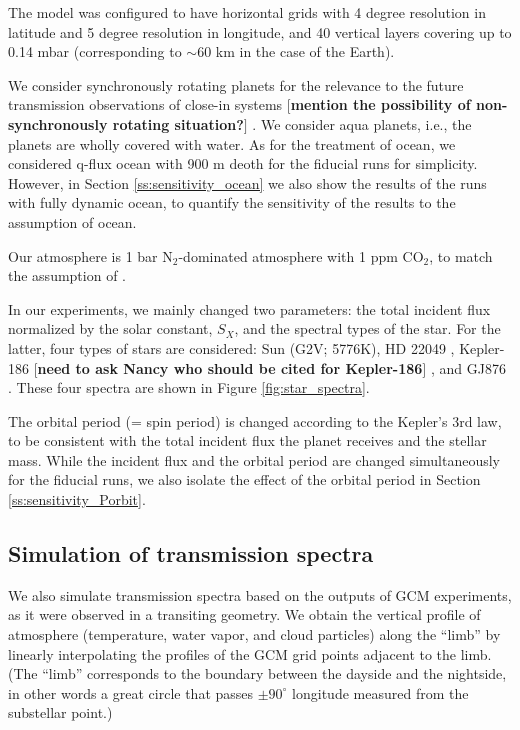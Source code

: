 \documentclass[11pt,numberedappendix,twocolappendix,]{emulateapj}
\def\memo#1{\color{red}$[${\bf #1}$]$ \color{black}}
\begin{document}
The model was configured to have horizontal grids with 4 degree resolution in latitude and 5 degree resolution in longitude, and 40 vertical layers covering up to 0.14 mbar (corresponding to $\sim 60$ km in the case of the Earth). 

We consider synchronously rotating planets for the relevance to the future transmission observations of close-in systems \memo{mention the possibility of non-synchronously rotating situation?}. 
We consider aqua planets, i.e., the planets are wholly covered with water. 
As for the treatment of ocean, we considered q-flux ocean with 900 m deoth for the fiducial runs for simplicity. However, in Section \ref{ss:sensitivity_ocean} we also show the results of the runs with fully dynamic ocean, to quantify the sensitivity of the results to the assumption of ocean. 

Our atmosphere is 1 bar N$_2$-dominated atmosphere with 1 ppm CO$_2$, to match the assumption of \citet{Kopparapu2016}. 

In our experiments, we mainly changed two parameters: the total incident flux normalized by the solar constant, $S_X$, and the spectral types of the star. 
For the latter, four types of stars are considered: Sun (G2V; 5776K), HD 22049 \citep[][K2V, 5084K, $0.82M_{\odot }$, $0.73R_{\odot }$]{Segura2003}, Kepler-186 \citep[][M1V, 3755K, $0.54M_{\odot }$, $0.52R_{\odot }$]{}\memo{need to ask Nancy who should be cited for Kepler-186}, and GJ876 \citep[][M4V, 3473K, $0.334M_{\odot }$, $0.36R_{\odot }$]{Domagal-Goldman2014}. 
These four spectra are shown in Figure \ref{fig:star_spectra}. 

The orbital period (= spin period) is changed according to the Kepler's 3rd law, to be consistent with the total incident flux the planet receives and the stellar mass. While the incident flux and the orbital period are changed simultaneously for the fiducial runs, we also isolate the effect of the orbital period in Section \ref{ss:sensitivity_Porbit}. 


\subsection{Simulation of transmission spectra}

We also simulate transmission spectra based on the outputs of GCM experiments, as it were observed in a transiting geometry. 
We obtain the vertical profile of atmosphere (temperature, water vapor, and cloud particles) along the ``limb'' by linearly interpolating the profiles of the GCM grid points adjacent to the limb. 
(The ``limb'' corresponds to the boundary between the dayside and the nightside, in other words a great circle that passes $\pm 90^{\circ} $ longitude measured from the substellar point.)
\end{document}
